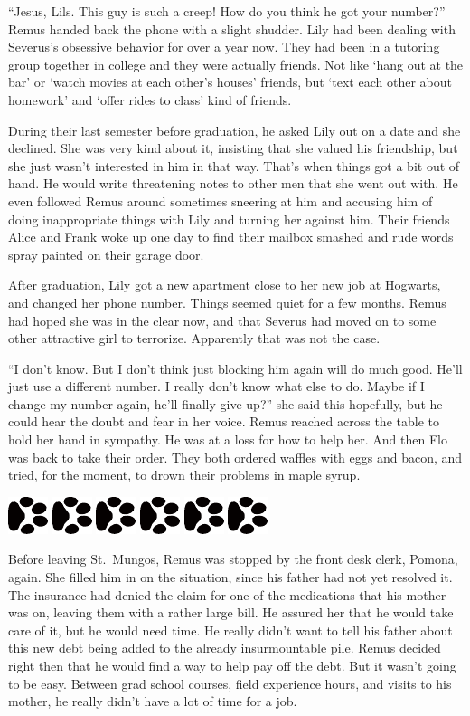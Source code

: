\documentclass[12pt,twoside,openright]{memoir}
\newcommand{\myrulez}{	
	\begin{center}
		\hspace{.5em}
		\includegraphics[angle=60]{dogprint.pdf}
		\hspace{.5em}
		\includegraphics[angle=120]{dogprint.pdf}
		\hspace{.5em}
		\includegraphics[angle=60]{dogprint.pdf}
		\hspace{.5em}
		\includegraphics[angle=120]{dogprint.pdf}
		\hspace{.5em}
		\includegraphics[angle=60]{dogprint.pdf}
		\hspace{.5em}
		\includegraphics[angle=120]{dogprint.pdf}
		\hspace{.5em}
	\end{center}
}
\begin{document}
``Jesus, Lils. This guy is such a creep! How do you think he got your number?'' Remus handed back the phone with a slight shudder. Lily had been dealing with Severus's obsessive behavior for over a year now. They had been in a tutoring group together in college and they were actually friends. Not like ‘hang out at the bar' or ‘watch movies at each other's houses' friends, but ‘text each other about homework' and ‘offer rides to class' kind of friends. 

During their last semester before graduation, he asked Lily out on a date and she declined. She was very kind about it, insisting that she valued his friendship, but she just wasn't interested in him in that way. That's when things got a bit out of hand. He would write threatening notes to other men that she went out with. He even followed Remus around sometimes sneering at him and accusing him of doing inappropriate things with Lily and turning her against him. Their friends Alice and Frank woke up one day to find their mailbox smashed and rude words spray painted on their garage door.

After graduation, Lily got a new apartment close to her new job at Hogwarts, and changed her phone number. Things seemed quiet for a few months. Remus had hoped she was in the clear now, and that Severus had moved on to some other attractive girl to terrorize. Apparently that was not the case.

``I don't know. But I don't think just blocking him again will do much good. He'll just use a different number. I really don't know what else to do. Maybe if I change my number again, he'll finally give up?'' she said this hopefully, but he could hear the doubt and fear in her voice. Remus reached across the table to hold her hand in sympathy. He was at a loss for how to help her. And then Flo was back to take their order. They both ordered waffles with eggs and bacon, and tried, for the moment, to drown their problems in maple syrup.

\myrulez

Before leaving St.\ Mungos, Remus was stopped by the front desk clerk, Pomona, again. She filled him in on the situation, since his father had not yet resolved it. The insurance had denied the claim for one of the medications that his mother was on, leaving them with a rather large bill. He assured her that he would take care of it, but he would need time. He really didn't want to tell his father about this new debt being added to the already insurmountable pile. Remus decided right then that he would find a way to help pay off the debt. But it wasn't going to be easy. Between grad school courses, field experience hours, and visits to his mother, he really didn't have a lot of time for a job.
\end{document}
